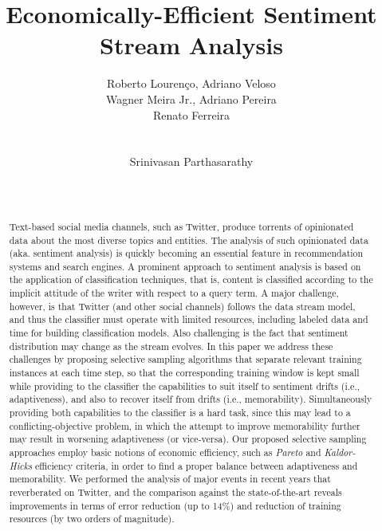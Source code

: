 \documentclass{vldb}
\begin{document}
\title{Economically-Efficient Sentiment Stream Analysis}

\author{
\alignauthor
Roberto Louren\c{c}o, Adriano Veloso\\Wagner Meira Jr., Adriano Pereira\\Renato Ferreira\\
       \\
       \\
\alignauthor
Srinivasan Parthasarathy\\
       \\
       \\
}

\date{}

\maketitle

\begin{abstract}
Text-based social media channels, such as Twitter, produce
torrents of opinionated data about the most diverse topics and entities.
The analysis of such opinionated data (aka. sentiment analysis) is quickly becoming an essential feature in recommendation systems
and search engines.
A prominent approach to sentiment analysis is based on the application of classification techniques, that is,
content is classified according to
the implicit attitude of the writer with respect to a query term.
A major challenge, however, is that Twitter (and other social channels)
follows the data stream model, and thus the classifier must operate
with limited resources, including labeled data and time for building classification models. Also challenging is the fact that
sentiment distribution may change as the stream evolves.
In this paper we address these challenges by proposing selective sampling algorithms that separate relevant training instances at each time step, so that the corresponding training window is kept small while providing to the classifier the capabilities to suit itself to sentiment drifts (i.e., adaptiveness), and also to recover itself from drifts (i.e., memorability). Simultaneously providing both capabilities to the classifier is a hard task, since this may
lead to a conflicting-objective problem, in which the attempt to improve memorability further may result in worsening adaptiveness (or vice-versa). Our proposed selective sampling approaches employ basic notions of economic efficiency, such as {\em Pareto} and {\em Kaldor-Hicks} efficiency criteria, in order to find a proper balance between adaptiveness and memorability. We performed the analysis of major events in recent years that reverberated on Twitter,
and the comparison against the state-of-the-art reveals improvements in terms of error reduction (up to 14\%) and reduction of training resources (by two orders of magnitude).
\end{abstract}
\end{document}
